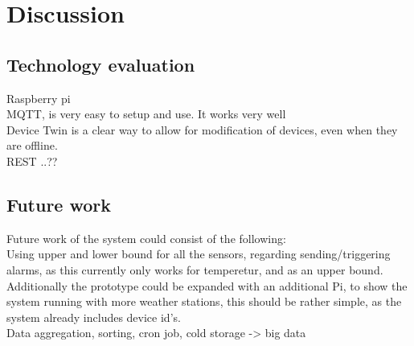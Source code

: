 \section{Discussion} \label{sec:discussion}

\subsection*{Technology evaluation}
Raspberry pi \\
MQTT, is very easy to setup and use. It works very well\\
Device Twin is a clear way to allow for modification of devices, even when they are offline.\\
REST ..??

\subsection*{Future work}
Future work of the system could consist of the following:\\
Using upper and lower bound for all the sensors, regarding sending/triggering alarms, as this currently only works for temperetur, and as an upper bound.\\
Additionally the prototype could be expanded with an additional Pi, to show the system running with more weather stations, this should be rather simple, as the system already includes device id's.\\ 
Data aggregation, sorting, cron job, cold storage -> big data







